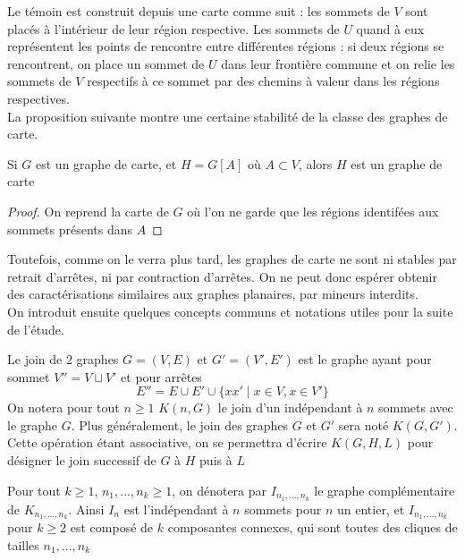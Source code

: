 \documentclass{scrartcl}
\begin{document}
\begin{flushleft}
Le témoin est construit depuis une carte comme suit : les sommets de $V$ sont placés à l'intérieur de leur région respective.
Les sommets de $U$ quand à eux représentent les points de rencontre entre différentes régions : si deux régions se rencontrent, on place
un sommet de $U$ dans leur frontière commune et on relie les sommets de $V$ respectifs à ce sommet par des chemins à valeur
dans les régions respectives.\\
La proposition suivante montre une certaine stabilité de la classe des graphes de carte.

\begin{prop}
    Si $G$ est un graphe de carte, et $H = G[A]$ où $A \subset V$, alors $H$ est un graphe de carte
\end{prop}

\begin{proof}
    On reprend la carte de $G$ où l'on ne garde que les régions identifées aux sommets présents dans $A$
\end{proof}

Toutefois, comme on le verra plus tard, les graphes de carte ne sont ni stables par retrait d'arrêtes, ni par contraction d'arrêtes.
On ne peut donc espérer obtenir des caractérisations similaires aux graphes planaires, par mineurs interdits.\\
On introduit ensuite quelques concepts communs et notations utiles pour la suite de l'étude.

\begin{def*}[Join]
    Le join de $2$ graphes $G = (V, E)$ et $G' = (V', E')$ est le graphe ayant pour sommet $V'' = V \sqcup V'$ et pour arrêtes
    \[ E'' = E \cup E' \cup \{ xx' \mid x \in V, x \in V' \} \]
    On notera pour tout $n \geq 1$ $K(n, G)$ le join d'un indépendant à $n$ sommets avec le graphe $G$. Plus généralement,
    le join des graphes $G$ et $G'$ sera noté $K(G, G')$. Cette opération étant associative, on se permettra
    d'écrire $K(G, H, L)$ pour désigner le join successif de $G$ à $H$ puis à $L$
\end{def*}

\begin{def*}
    Pour tout $k \geq 1$, $n_1, ..., n_k \geq 1$, on dénotera par $I_{n_1, ..., n_k}$ le graphe complémentaire de $K_{n_1, ..., n_k}$.
    Ainsi $I_n$ est l'indépendant à $n$ sommets pour $n$ un entier, et $I_{n_1, ..., n_k}$ pour $k \geq 2$ est composé de $k$
    composantes connexes, qui sont toutes des cliques de tailles $n_1, ..., n_k$
\end{def*}


\end{flushleft}
\end{document}
